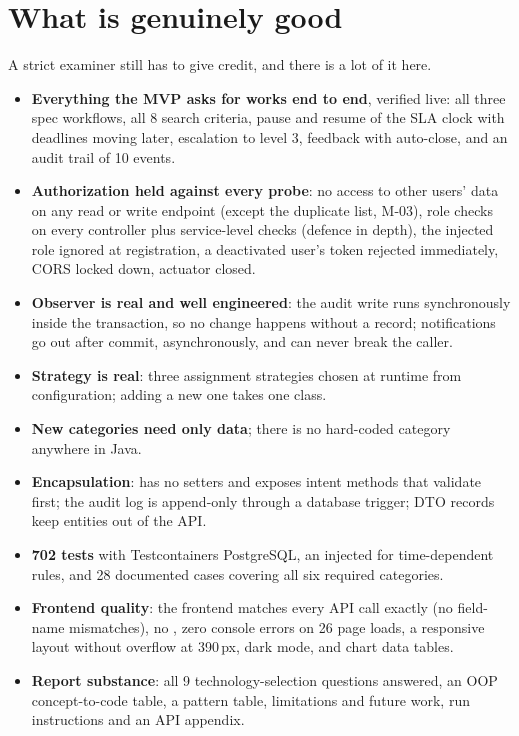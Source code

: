 \documentclass[11pt,a4paper]{article}
\newcommand{\code}[1]{{\ttfamily\small\detokenize{#1}}}
\begin{document}
\section{What is genuinely good}
A strict examiner still has to give credit, and there is a lot of it here.
\begin{tcolorbox}[colback=goodsoft,colframe=good,boxrule=0.5pt,arc=2pt]
\small
\begin{itemize}
\item \textbf{Everything the MVP asks for works end to end}, verified live: all three spec workflows, all 8 search criteria,
  pause and resume of the SLA clock with deadlines moving later, escalation to level 3, feedback with auto-close, and an audit trail of 10 events.
\item \textbf{Authorization held against every probe}: no access to other users' data on any read or write endpoint (except the duplicate list,
  M-03), role checks on every controller plus service-level checks (defence in depth), the injected role ignored at
  registration, a deactivated user's token rejected immediately, CORS locked down, actuator closed.
\item \textbf{Observer is real and well engineered}: the audit write runs synchronously inside the transaction, so no change happens without a record;
  notifications go out after commit, asynchronously, and can never break the caller.
\item \textbf{Strategy is real}: three assignment strategies chosen at runtime from configuration; adding a new one takes one class.
\item \textbf{New categories need only data}; there is no hard-coded category anywhere in Java.
\item \textbf{Encapsulation}: \code{Incident} has no setters and exposes intent methods that validate first; the audit log is append-only
  through a database trigger; DTO records keep entities out of the API.
\item \textbf{702 tests} with Testcontainers PostgreSQL, an injected \code{Clock} for time-dependent rules, and 28 documented
  cases covering all six required categories.
\item \textbf{Frontend quality}: the frontend matches every API call exactly (no field-name mismatches), no \code{dangerouslySetInnerHTML},
  zero console errors on 26 page loads, a responsive layout without overflow at 390\,px, dark mode, and chart data tables.
\item \textbf{Report substance}: all 9 technology-selection questions answered, an OOP concept-to-code table, a pattern table,
  limitations and future work, run instructions and an API appendix.
\end{itemize}
\end{tcolorbox}
\end{document}
